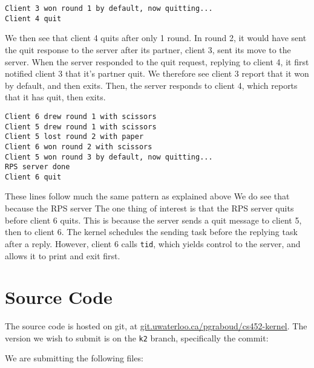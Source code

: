 \documentclass[titlepage]{article}
\begin{document}
\begin{verbatim}
Client 3 won round 1 by default, now quitting...
Client 4 quit
\end{verbatim}

We then see that client 4 quits after only 1 round.
In round 2, it would have sent the quit response to the server after its partner, client 3,
sent its move to the server.
When the server responded to the quit request, replying to client 4, it first notified client 3
that it's partner quit.
We therefore see client 3 report that it won by default, and then exits.
Then, the server responds to client 4, which reports that it has quit, then exits.

\begin{verbatim}
Client 6 drew round 1 with scissors
Client 5 drew round 1 with scissors
Client 5 lost round 2 with paper
Client 6 won round 2 with scissors
Client 5 won round 3 by default, now quitting...
RPS server done
Client 6 quit
\end{verbatim}

These lines follow much the same pattern as explained above
We do see that because the RPS server
The one thing of interest is that the RPS server quits before client 6 quits.
This is because the server sends a quit message to client 5, then to client 6.
The kernel schedules the sending task before the replying task after a reply.
However, client 6 calls \texttt{tid}, which yields control to the server,
and allows it to print and exit first.

\section{Source Code}
The source code is hosted on git, at \url{git.uwaterloo.ca/pgraboud/cs452-kernel}.
The version we wish to submit is on the \texttt{k2} branch, specifically
the commit:

We are submitting the following files:


\end{document}
